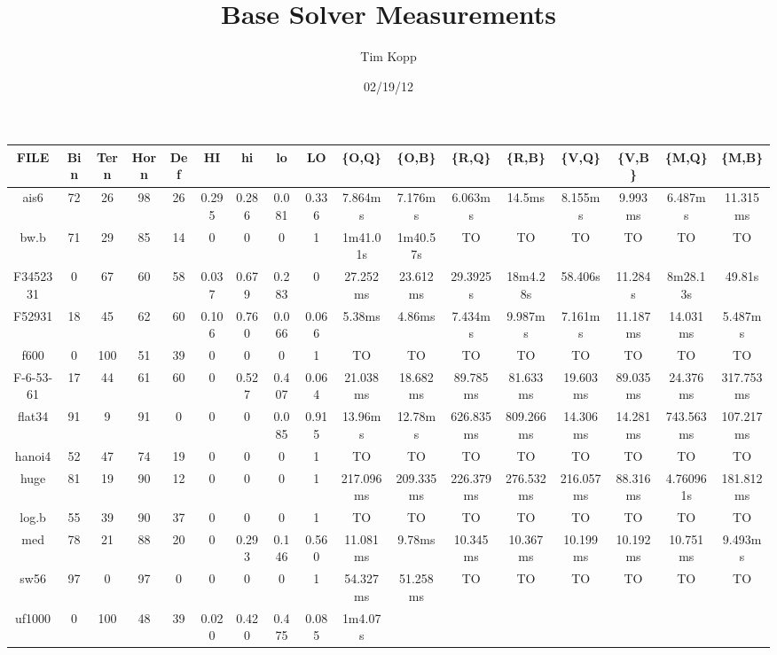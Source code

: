 \documentclass{article}
\title{Base Solver Measurements}
\author{Tim Kopp}
\date{02/19/12}
\begin{document}
\maketitle

\begin{table}[ht!]
\centering
\begin{tabular}{|c||c|c|c|c|c|c|c|c||c|c|c|c|c|c|c|c|}\hline
FILE & Bin & Tern & Horn & Def & HI & hi & lo & LO & \{O,Q\} & \{O,B\} & \{R,Q\} & \{R,B\} & \{V,Q\} & \{V,B\} & \{M,Q\} & \{M,B\} \\\hline\hline
ais6 & 72 & 26 & 98 & 26 & 0.295 & 0.286 & 0.081 & 0.336 & 7.864ms & 7.176ms & 6.063ms & 14.5ms & 8.155ms & 9.993ms & 6.487ms & 11.315ms \\\hline
bw.b & 71 & 29 & 85 & 14 & 0 & 0 & 0 & 1 & 1m41.01s & 1m40.57s & TO & TO & TO & TO & TO & TO \\\hline
F3452331 & 0 & 67 & 60 & 58 & 0.037 & 0.679 & 0.283 & 0 & 27.252ms & 23.612ms & 29.3925s & 18m4.28s & 58.406s & 11.284s & 8m28.13s & 49.81s \\\hline
F52931 & 18 & 45 & 62 & 60 & 0.106 & 0.760 & 0.066 & 0.066 & 5.38ms & 4.86ms & 7.434ms & 9.987ms & 7.161ms & 11.187ms & 14.031ms & 5.487ms \\\hline
f600 & 0 & 100 & 51 & 39 & 0 & 0 & 0 & 1 & TO & TO & TO & TO & TO & TO & TO & TO \\\hline
F-6-53-61 & 17 & 44 & 61 & 60 & 0 & 0.527 & 0.407 & 0.064 & 21.038ms & 18.682ms & 89.785ms & 81.633ms & 19.603ms & 89.035ms & 24.376ms & 317.753ms \\\hline
flat34 & 91 & 9 & 91 & 0 & 0 & 0 & 0.085 & 0.915 & 13.96ms & 12.78ms & 626.835ms & 809.266ms & 14.306ms & 14.281ms & 743.563ms & 107.217ms \\\hline
hanoi4 & 52 & 47 & 74 & 19 & 0 & 0 & 0 & 1 & TO & TO & TO & TO & TO & TO & TO & TO \\\hline
huge & 81 & 19 & 90 & 12 & 0 & 0 & 0 & 1 & 217.096ms & 209.335ms & 226.379ms & 276.532ms & 216.057ms & 88.316ms & 4.760961s & 181.812ms \\\hline
log.b & 55 & 39 & 90 & 37 & 0 & 0 & 0 & 1& TO & TO & TO & TO & TO & TO & TO & TO \\\hline
med & 78 & 21 & 88 & 20 & 0 & 0.293 & 0.146 & 0.560 & 11.081ms & 9.78ms & 10.345ms & 10.367ms & 10.199ms & 10.192ms & 10.751ms & 9.493ms \\\hline
sw56 & 97 & 0 & 97 & 0 & 0 & 0 & 0 & 1 & 54.327ms & 51.258ms & TO & TO & TO & TO & TO & TO \\\hline
uf1000 & 0 & 100 & 48 & 39 & 0.020 & 0.420 & 0.475 & 0.085 & 1m4.07s &

\end{tabular}
\end{table}
\end{document}

